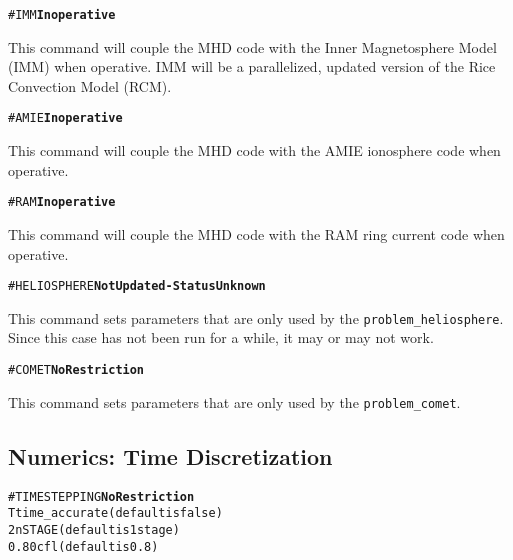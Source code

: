 \begin{alltt}
#IMM    \hfill {\bf Inoperative}
\end{alltt}

This command will couple the MHD code with the Inner Magnetosphere
Model (IMM) when operative.  IMM will be a parallelized, updated
version of the Rice Convection Model (RCM).
\ \ \\

\begin{alltt}
#AMIE   \hfill {\bf Inoperative}
\end{alltt}

This command will couple the MHD code with the AMIE ionosphere
code when operative.
\ \ \\

\begin{alltt}
#RAM     \hfill {\bf Inoperative}
\end{alltt}

This command will couple the MHD code with the RAM ring
current code when operative.
\ \ \\

\begin{alltt}
#HELIOSPHERE  \hfill  {\bf Not Updated - Status Unknown}
\end{alltt}

This command sets parameters that are only used by the {\tt problem\_heliosphere}.
Since this case has not been run for a while, it may or may not work.
\ \ \\

\begin{alltt}
#COMET      \hfill {\bf No Restriction}
\end{alltt}

This command sets parameters that are only used by the {\tt problem\_comet}.
\ \ \\



\subsection{Numerics: Time Discretization \label{section:time}}

\begin{alltt}
#TIMESTEPPING    \hfill {\bf No Restriction}
T                      time_accurate          (default is false)
2                      nSTAGE                 (default is 1 stage)
0.80                   cfl                    (default is 0.8)
\end{alltt}

